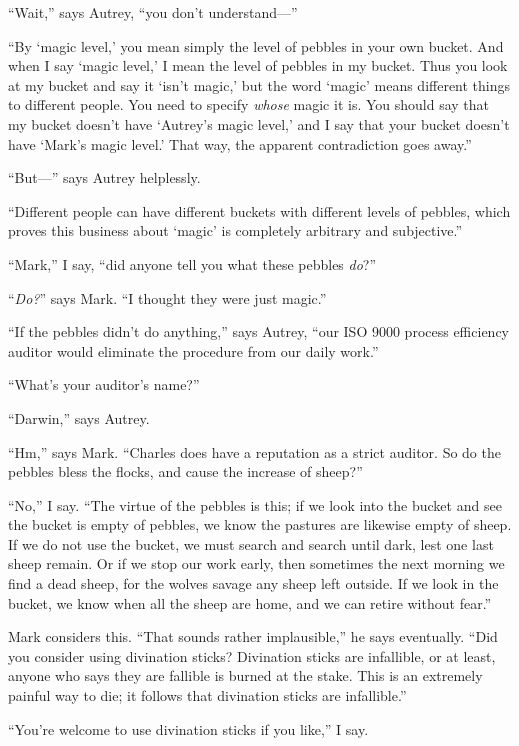 {
 ``Wait,'' says Autrey,
``you don't
understand---''}

{
 ``By `magic
level,' you mean simply the level of pebbles in your
own bucket. And when I say `magic
level,' I mean the level of pebbles in my bucket. Thus
you look at my bucket and say it `isn't
magic,' but the word
`magic' means different things to
different people. You need to specify \textit{whose} magic it is. You
should say that my bucket doesn't have
`Autrey's magic level,'
and I say that your bucket doesn't have
`Mark's magic level.'
That way, the apparent contradiction goes away.''}

{
 ``But---'' says Autrey
helplessly.}

{
 ``Different people can have different buckets
with different levels of pebbles, which proves this business about
`magic' is completely arbitrary and
subjective.''}

{
 ``Mark,'' I say,
``did anyone tell you what these pebbles
\textit{do}?''}

{
 ``\textit{Do?}'' says Mark.
``I thought they were just magic.''}

{
 ``If the pebbles didn't do
anything,'' says Autrey, ``our ISO
9000 process efficiency auditor would eliminate the procedure from our
daily work.''}

{
 ``What's your
auditor's name?''}

{
 ``Darwin,'' says Autrey.}

{
 ``Hm,'' says Mark.
``Charles does have a reputation as a strict auditor.
So do the pebbles bless the flocks, and cause the increase of
sheep?''}

{
 ``No,'' I say.
``The virtue of the pebbles is this; if we look into
the bucket and see the bucket is empty of pebbles, we know the pastures
are likewise empty of sheep. If we do not use the bucket, we must
search and search until dark, lest one last sheep remain. Or if we stop
our work early, then sometimes the next morning we find a dead sheep,
for the wolves savage any sheep left outside. If we look in the bucket,
we know when all the sheep are home, and we can retire without
fear.''}

{
 Mark considers this. ``That sounds rather
implausible,'' he says eventually.
``Did you consider using divination sticks? Divination
sticks are infallible, or at least, anyone who says they are fallible
is burned at the stake. This is an extremely painful way to die; it
follows that divination sticks are infallible.''}

{
 ``You're welcome to use
divination sticks if you like,'' I say.}


